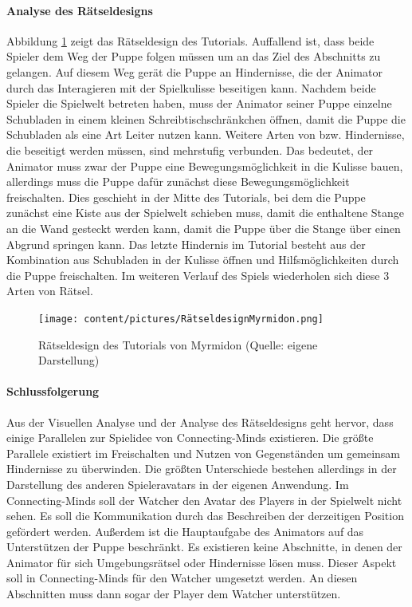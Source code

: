 \paragraph{Analyse des Rätseldesigns}
Abbildung \ref{fig:myrmidon-uml} zeigt das Rätseldesign des Tutorials. Auffallend ist, dass beide Spieler dem Weg der Puppe folgen müssen um an das Ziel des Abschnitts zu gelangen. Auf diesem Weg gerät die Puppe an Hindernisse, die der Animator durch das Interagieren mit der Spielkulisse beseitigen kann. Nachdem beide Spieler die Spielwelt betreten haben, muss der Animator seiner Puppe einzelne Schubladen in einem kleinen Schreibtischschränkchen öffnen, damit die Puppe die Schubladen als eine Art Leiter nutzen kann. Weitere Arten von  bzw. Hindernisse, die beseitigt werden müssen, sind mehrstufig verbunden. Das bedeutet, der Animator muss zwar der Puppe eine Bewegungsmöglichkeit in die Kulisse bauen, allerdings muss die Puppe dafür zunächst diese Bewegungsmöglichkeit freischalten. Dies geschieht in der Mitte des Tutorials, bei dem die Puppe zunächst eine Kiste aus der Spielwelt schieben muss, damit die enthaltene Stange an die Wand gesteckt werden kann, damit die Puppe über die Stange über einen Abgrund springen kann.
Das letzte Hindernis im Tutorial besteht aus der Kombination aus Schubladen in der Kulisse öffnen und Hilfsmöglichkeiten durch die Puppe freischalten. Im weiteren Verlauf des Spiels wiederholen sich diese 3 Arten von Rätsel. 
\begin{figure}[ht]
\centering
\texttt{[image: content/pictures/RätseldesignMyrmidon.png]}
\caption{Rätseldesign des Tutorials von Myrmidon (Quelle: eigene Darstellung)}
\label{fig:myrmidon-uml}
\end{figure}

\paragraph{Schlussfolgerung}
Aus der Visuellen Analyse und der Analyse des Rätseldesigns geht hervor, dass einige Parallelen zur Spielidee von Connecting-Minds existieren. Die größte Parallele existiert im Freischalten und Nutzen von Gegenständen um gemeinsam Hindernisse zu überwinden. Die größten Unterschiede bestehen allerdings in der Darstellung des anderen Spieleravatars in der eigenen Anwendung. Im Connecting-Minds soll der Watcher den Avatar des Players in der Spielwelt nicht sehen. Es soll die Kommunikation durch das Beschreiben der derzeitigen Position gefördert werden. Außerdem ist die Hauptaufgabe des Animators auf das Unterstützen der Puppe beschränkt. Es existieren keine Abschnitte, in denen der Animator für sich Umgebungsrätsel oder Hindernisse lösen muss. Dieser Aspekt soll in Connecting-Minds für den Watcher umgesetzt werden. An diesen Abschnitten muss dann sogar der Player dem Watcher unterstützen. 

